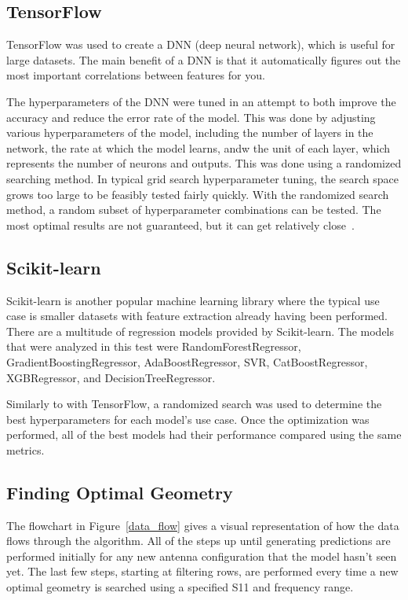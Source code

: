 \documentclass[lettersize,journal]{IEEEtran}
\begin{document}
\subsection{TensorFlow}
TensorFlow was used to create a DNN (deep neural network), which is useful for large datasets. The main benefit of a DNN is that it automatically figures out the most important correlations between features for you. 

The hyperparameters of the DNN were tuned in an attempt to both improve the accuracy and reduce the error rate of the model. This was done by adjusting various hyperparameters of the model, including the number of layers in the network, the rate at which the model learns, andw the unit of each layer, which represents the number of neurons and outputs. This was done using a randomized searching method. In typical grid search hyperparameter tuning, the search space grows too large to be feasibly tested fairly quickly. With the randomized search method, a random subset of hyperparameter combinations can be tested. The most optimal results are not guaranteed, but it can get relatively close~\cite{omalley2019kerastuner}. 


\subsection{Scikit-learn}
Scikit-learn is another popular machine learning library where the typical use case is smaller datasets with feature extraction already having been performed. There are a multitude of regression models provided by Scikit-learn. The models that were analyzed in this test were RandomForestRegressor, GradientBoostingRegressor, AdaBoostRegressor, SVR, CatBoostRegressor, XGBRegressor, and DecisionTreeRegressor.

Similarly to with TensorFlow, a randomized search was used to determine the best hyperparameters for each model's use case. Once the optimization was performed, all of the best models had their performance compared using the same metrics. 

\subsection{Finding Optimal Geometry}
The flowchart in Figure~\ref{data_flow} gives a visual representation of how the data flows through the algorithm. All of the steps up until generating predictions are performed initially for any new antenna configuration that the model hasn't seen yet. The last few steps, starting at filtering rows, are performed every time a new optimal geometry is searched using a specified S11 and frequency range. 
\end{document}
